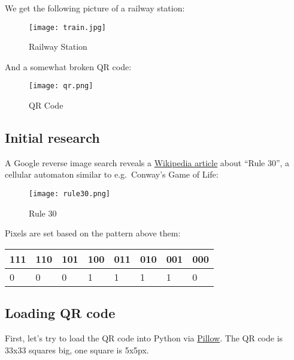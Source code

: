 \documentclass[11pt]{article}
\begin{document}
We get the following picture of a railway station:

\begin{figure}
\centering
\texttt{[image: train.jpg]}
\caption{Railway Station}
\end{figure}

And a somewhat broken QR code:

\begin{figure}
\centering
\texttt{[image: qr.png]}
\caption{QR Code}
\end{figure}

    \hypertarget{initial-research}{%
\subsection{Initial research}\label{initial-research}}

A Google reverse image search reveals a
\href{https://en.wikipedia.org/wiki/Rule_30}{Wikipedia article} about
``Rule 30'', a cellular automaton similar to e.g.~Conway's Game of Life:

\begin{figure}
\centering
\texttt{[image: rule30.png]}
\caption{Rule 30}
\end{figure}

Pixels are set based on the pattern above them:

\begin{longtable}[]{@{}llllllll@{}}
\toprule
111 & 110 & 101 & 100 & 011 & 010 & 001 & 000\tabularnewline
\midrule
\endhead
0 & 0 & 0 & 1 & 1 & 1 & 1 & 0\tabularnewline
\bottomrule
\end{longtable}

    \hypertarget{loading-qr-code}{%
\subsection{Loading QR code}\label{loading-qr-code}}

First, let's try to load the QR code into Python via
\href{https://pillow.readthedocs.io/}{Pillow}. The QR code is 33x33
squares big, one square is 5x5px.
\end{document}

